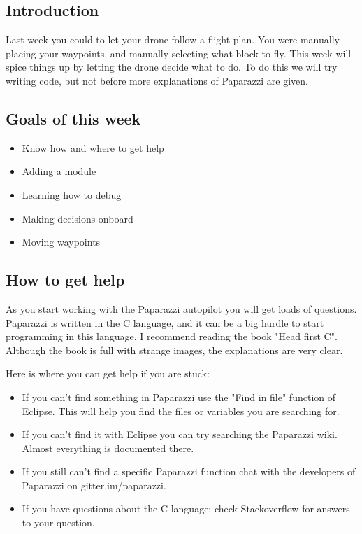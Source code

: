 \documentclass{article}
\begin{document}

\subsection*{Introduction}
Last week you could to let your drone follow a flight plan. You were manually placing your waypoints, and manually selecting what block to fly. This week will spice things up by letting the drone decide what to do. 
To do this we will try writing code, but not before more explanations of Paparazzi are given. 
\subsection*{Goals of this week}
\begin{itemize}
\item Know how and where to get help
\item Adding a module
\item Learning how to debug
\item Making decisions onboard
\item Moving waypoints
\end{itemize}
\subsection*{How to get help}
As you start working with the Paparazzi autopilot you will get loads of questions. Paparazzi is written in the C language, and it can be a big hurdle to start programming in this language. I recommend reading the book "Head first C". Although the book is full with strange images, the explanations are very clear. 

Here is where you can get help if you are stuck: 
\begin{itemize}
\item If you can't find something in Paparazzi use the "Find in file" function of Eclipse. This will help you find the files or variables you are searching for.
\item If you can't find it with Eclipse you can try searching the Paparazzi wiki. Almost everything is documented there. 
\item If you still can't find a specific Paparazzi function chat with the developers of Paparazzi on gitter.im/paparazzi.
\item If you have questions about the C language: check Stackoverflow for answers to your question.
\end{itemize}
\end{document}
